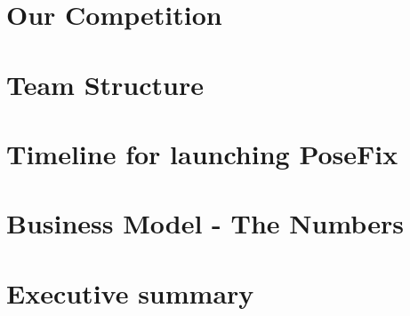 \documentclass[a4paper, 11pt]{report}
\begin{document}
	{
		\FloatBarrier
		\chapter{Our Competition}
		\label{chp:competition}
		
	}

	{
		\FloatBarrier
		\chapter{Team Structure}
		\label{chp:team_structure}
		
	}

	{
		\FloatBarrier
		\chapter{Timeline for launching PoseFix}
		\label{chp:timeline}
		
	}

	{
		\FloatBarrier
		\chapter{Business Model - The Numbers}
		\label{chp:business_model}
		
	}

	{
		\FloatBarrier
		\chapter{Executive summary}
		\label{chp:summary}
		
	}

	{
		\FloatBarrier
		\newpage
		\printbibliography[title = References]
	}
\end{document}
